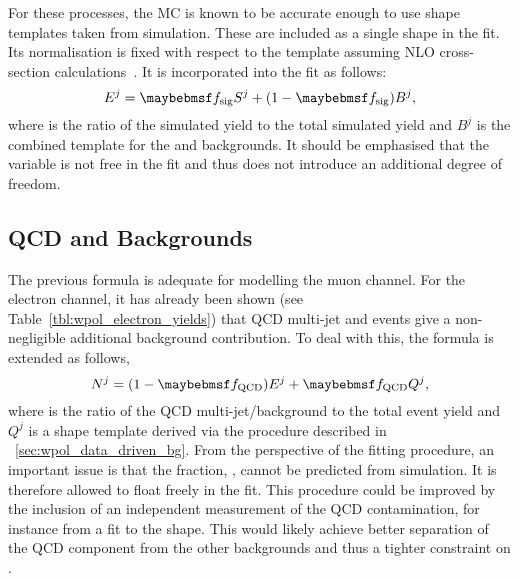 For these processes, the \ac{MC} is known to be accurate enough to use \LP shape
templates taken from simulation. These are included as a single shape in the
fit. Its normalisation is fixed with respect to the \Wjets template assuming
\ac{NLO} cross-section
calculations~\cite{ellis_wp3jet,berger_wp4jet,heavy_quark,top_quark,drellyan}. It
is incorporated into the fit as follows:
\begin{equation*}
E^j = \fsig S^j + (1-\fsig) B^j,
\end{equation*}
where \fsig is the ratio of the simulated \Wjets yield to the total
simulated yield and $B^j$ is the combined \LP template for the \Zjets and \ttbar
backgrounds. It should be emphasised that the variable \fsig is not
free in the fit and thus does not introduce an additional degree of freedom.

\subsection[\acs{QCD} and \texorpdfstring{\gammajets}{Photon+jets} Backgrounds]{\acs{QCD} and \gammajets Backgrounds}
The previous formula is adequate for modelling the muon channel. For the
electron channel, it has already been shown (see
Table~\ref{tbl:wpol_electron_yields}) that \ac{QCD} multi-jet and \gammajets
events give a non-negligible additional background contribution. To deal with
this, the formula is extended as follows,
\begin{equation*}
N^j = (1 - \fQCD) E^j + \fQCD Q^j,
\end{equation*}
where \fQCD is the ratio of the QCD multi-jet/\gammajets background to the total
event yield and $Q^j$ is a shape template derived via the procedure described in
\sec~\ref{sec:wpol_data_driven_bg}. From the perspective of the fitting
procedure, an important issue is that the fraction, \fQCD, cannot be predicted
from simulation. It is therefore allowed to float freely in the fit. This
procedure could be improved by the inclusion of an independent measurement of
the \ac{QCD} contamination, for instance from a fit to the \MET shape. This
would likely achieve better separation of the \ac{QCD} component from the other
backgrounds and thus a tighter constraint on \fQCD.

